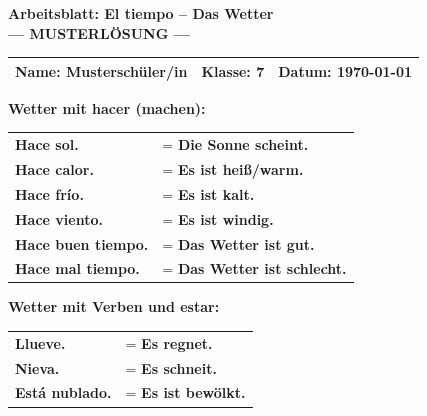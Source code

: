 \documentclass[11pt, a4paper]{article}
\newcommand{\fachfarbe}{spanisch}
\newcommand{\thema}{El tiempo -- Das Wetter}
\newcommand{\klasse}{7}
\newcommand{\datum}{\today}
\newcommand{\loesung}[1]{\textcolor{loesung}{\textbf{#1}}}
\newcommand{\es}[1]{\textcolor{\fachfarbe}{\textbf{#1}}}
\begin{document}

\begin{center}
    {\Large\bfseries\textcolor{\fachfarbe}{Arbeitsblatt: \thema}}\\[0.3em]
    {\large\textcolor{loesung}{\textbf{--- MUSTERLÖSUNG ---}}}
\end{center}

\vspace{5pt}

\noindent
\begin{tabularx}{\textwidth}{|X|X|X|}
\hline
\textbf{Name:} \textcolor{loesung}{Musterschüler/in} &
\textbf{Klasse:} \klasse &
\textbf{Datum:} \datum \\
\hline
\end{tabularx}

\vspace{15pt}


\begin{merkkasten}
\textbf{Wetter mit \es{hacer} (machen):}

\vspace{0.5em}

\begin{tabular}{ll}
\es{Hace sol.} & = \loesung{Die Sonne scheint.} \\[0.8em]
\es{Hace calor.} & = \loesung{Es ist heiß/warm.} \\[0.8em]
\es{Hace frío.} & = \loesung{Es ist kalt.} \\[0.8em]
\es{Hace viento.} & = \loesung{Es ist windig.} \\[0.8em]
\es{Hace buen tiempo.} & = \loesung{Das Wetter ist gut.} \\[0.8em]
\es{Hace mal tiempo.} & = \loesung{Das Wetter ist schlecht.} \\
\end{tabular}

\vspace{1em}

\textbf{Wetter mit Verben und \es{estar}:}

\vspace{0.5em}

\begin{tabular}{ll}
\es{Llueve.} & = \loesung{Es regnet.} \\[0.8em]
\es{Nieva.} & = \loesung{Es schneit.} \\[0.8em]
\es{Está nublado.} & = \loesung{Es ist bewölkt.} \\
\end{tabular}

\end{merkkasten}
\end{document}
